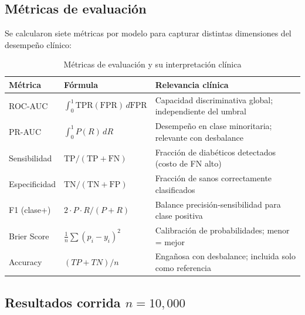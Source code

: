 \documentclass[12pt,a4paper]{article}
\begin{document}
\subsection{Métricas de evaluación}

Se calcularon siete métricas por modelo para capturar distintas dimensiones del desempeño clínico:

\begin{table}[H]
  \centering
  \caption{Métricas de evaluación y su interpretación clínica}
  \label{tab:metricas_def}
  \begin{tabularx}{\linewidth}{llX}
    \toprule
    \textbf{Métrica} & \textbf{Fórmula} & \textbf{Relevancia clínica}\\
    \midrule
    ROC-AUC & $\int_0^1 \text{TPR}(\text{FPR})\,d\text{FPR}$ & Capacidad discriminativa global; independiente del umbral\\
    PR-AUC & $\int_0^1 P(R)\,dR$ & Desempeño en clase minoritaria; relevante con desbalance\\
    Sensibilidad & $\text{TP}/(\text{TP}+\text{FN})$ & Fracción de diabéticos detectados (costo de FN alto)\\
    Especificidad & $\text{TN}/(\text{TN}+\text{FP})$ & Fracción de sanos correctamente clasificados\\
    F1 (clase+) & $2\cdot P\cdot R/(P+R)$ & Balance precisión-sensibilidad para clase positiva\\
    Brier Score & $\frac{1}{n}\sum(p_i - y_i)^2$ & Calibración de probabilidades; menor = mejor\\
    Accuracy & $(TP+TN)/n$ & \textcolor{rojoAlerta}{Engañosa con desbalance; incluida solo como referencia}\\
    \bottomrule
  \end{tabularx}
\end{table}

\subsection{Resultados corrida $n=10{,}000$}
\end{document}

